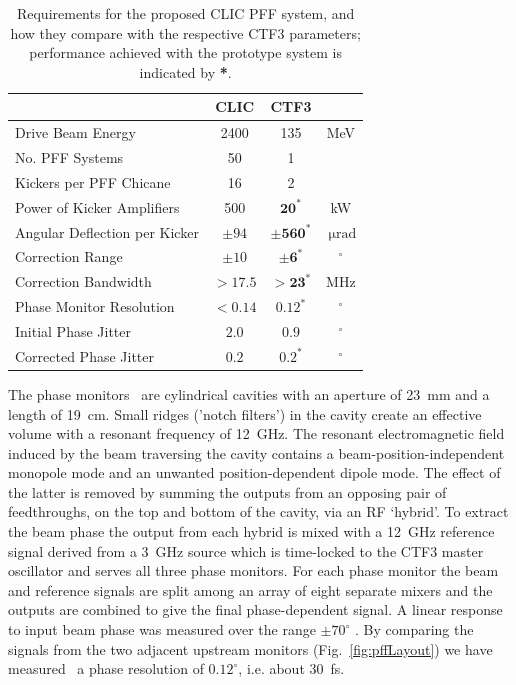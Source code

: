 \documentclass[%
 reprint,
 superscriptaddress,
 amsmath,
 amssymb,
 prl,
]{revtex4-1}
\begin{document}
\begin{table}
	\caption{\label{tab:pffspecs}
	    Requirements for the proposed CLIC PFF system, and how they compare 
	    with the respective CTF3 parameters; performance achieved with the 
	    prototype system is indicated by \textbf{*}.}
\begin{ruledtabular}
	\begin{tabular}{lccc}
		 & CLIC & CTF3 \\
		\hline
		Drive Beam Energy & 2400 & 135 & MeV \\
		No. PFF Systems & 50 & 1 & \\
		Kickers per PFF Chicane & 16 & 2 & \\
		Power of Kicker Amplifiers & 500 & \(\mathbf{20^*}\) & kW \\
		Angular Deflection per Kicker & \(\pm94\) & 
		\(\mathbf{\pm560^*}\) & \(~\mathrm{\mu rad}\) \\
		Correction Range & \(\pm 10\) & \(\mathbf{\pm 6^*}\) & \(^\circ\) \\
		Correction Bandwidth & \(>17.5\) & \(\mathbf{>23^*}\) & MHz \\
		Phase Monitor Resolution & \(< 0.14\) & \(\mathbf{0.12^*}\) &  
		\(^\circ\)   \\
		Initial Phase Jitter & \(2.0\) & \(0.9\) &  \(^\circ\)  \\
		Corrected Phase Jitter & \(0.2\) & \(\mathbf{0.2^*}\) &  \(^\circ\)  \\
	\end{tabular}
\end{ruledtabular}
\end{table}


The phase monitors~\cite{phMonEuCard} are cylindrical cavities with an aperture 
of 23~mm and a length of 19~cm. Small ridges (’notch filters’) in the cavity 
create an effective volume with a resonant frequency of 12~GHz. 
The resonant electromagnetic field induced by the beam traversing the cavity 
contains a beam-position-independent monopole mode and an unwanted 
position-dependent dipole mode. The 
effect of the latter is removed by summing the outputs from an opposing pair 
of feedthroughs, on the top and bottom of the cavity, via an RF ‘hybrid’. 
To extract the beam phase the output from each hybrid 
is mixed with a 12~GHz reference signal derived from a 3~GHz source which is 
time-locked to the CTF3 master oscillator and serves all three phase monitors.
For each phase monitor the beam and reference signals are 
split among an array of eight separate mixers and the outputs are combined to 
give the final phase-dependent signal. A linear response to input beam phase 
was measured over the range \(\pm70^\circ\) \cite{Skowron2013}. By 
comparing the signals from the two adjacent upstream monitors 
(Fig.~\ref{fig:pffLayout}) we have measured~\cite{RobertsThesis} a phase 
resolution of \(0.12^\circ\), i.e. about 30~fs.
\end{document}
